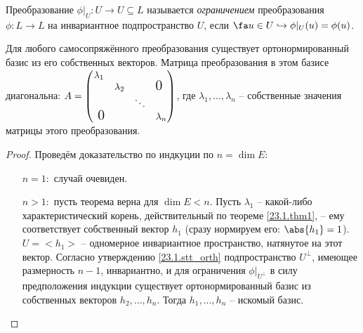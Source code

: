   \begin{defn}
  Преобразование $\phi|_U:U\rightarrow U \subseteq L$ называется \textit{ограничением} преобразования $\phi:L\rightarrow L$ на инвариантное подпространство $U$, если $\fa u \in U \hookrightarrow \phi|_U(u)=\phi(u)$.
  \end{defn}  
  
  \begin{thm}
  Для любого самосопряжённого преобразования существует ортонормированный базис из его собственных векторов. Матрица преобразования в этом базисе диагональна: $A=
  \begin{pmatrix}
  \lambda_1 &           &        & \\
            & \lambda_2 &        & \fudge {0 }  \\
            &			& \ddots & \\
  \fudge{ 0}&			&		 & \lambda_n \\
  \end{pmatrix}$, где $\lambda_1,...,\lambda_n$ -- собственные значения матрицы этого преобразования.
  \end{thm}
  \begin{proof} Проведём доказательство по индкуции по $n=\dim E$:
  \linebreak\vspace*{-\baselineskip}
  \begin{itemize}
  \item[\underline{$n=1:$}] случай очевиден.
  \item[\underline{$n>1:$}] пусть теорема верна для $\dim E<n$. Пусть $\lambda_1$ -- какой-либо характеристический корень, действительный по теореме \ref{23.1.thm1}, -- ему соответствует собственный вектор $h_1$ (сразу нормируем его: $\abs{h_1}=1$). $U=<h_1>$ -- одномерное инвариантное пространство, натянутое на этот вектор. Согласно утверждению \ref{23.1.stt_orth} подпространство $U^\perp$, имеющее размерность $n-1$, инвариантно, и для ограничения $\phi|_{U^\perp}$ в силу предположения индукции существует ортонормированный базис из собственных векторов $h_2,...,h_n$. Тогда $h_1,...,h_n$ -- искомый базис.

  \end{itemize}
  \vspace{-1.65\baselineskip}  
  \end{proof}

